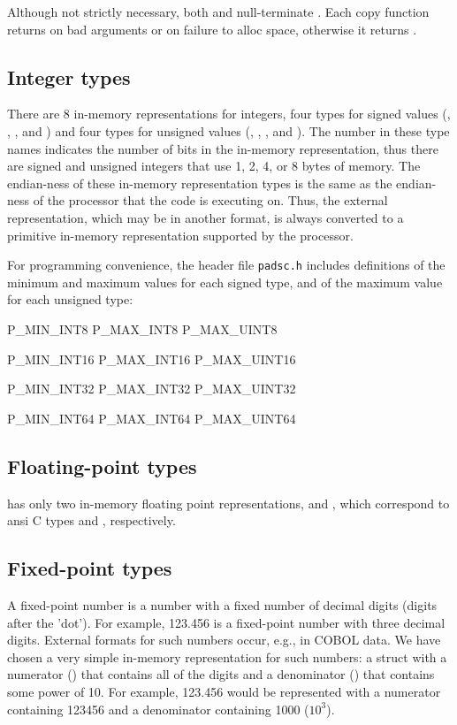 Although not strictly necessary, both  and  null-terminate .
Each copy function returns  on bad arguments or on failure to alloc space, otherwise it returns .

\subsection{Integer types}

There are 8 in-memory representations for integers, four types for
signed values (, , , and )
and four types for unsigned values (, , , and ).
The number in these type names indicates the number of bits in the in-memory representation,
thus there are signed and unsigned integers that use 1, 2, 4, or 8 bytes of memory.
The endian-ness of these in-memory representation types is the same as the
endian-ness of the processor that the code is executing on.  Thus,
the external representation, which may be in another format, is always converted
to a primitive in-memory representation supported by the processor.

For programming convenience, the header file {\tt padsc.h} includes definitions of the minimum
and maximum values for each signed type, and of the maximum value for each unsigned type:
\begin{tinycode}
P_MIN_INT8
P_MAX_INT8
P_MAX_UINT8

P_MIN_INT16
P_MAX_INT16
P_MAX_UINT16

P_MIN_INT32
P_MAX_INT32
P_MAX_UINT32

P_MIN_INT64
P_MAX_INT64
P_MAX_UINT64
\end{tinycode}

\subsection{Floating-point types}

\PADSL{} has only two in-memory floating point representations,
 and , which correspond to ansi C types 
and , respectively.

\subsection{Fixed-point types}

A fixed-point number is a number with a fixed number of decimal digits
(digits after the 'dot').  For example, 123.456 is a fixed-point
number with three decimal digits.  External formats for such numbers
occur, e.g., in COBOL data.  We have chosen a very simple in-memory
representation for such numbers: a struct with a numerator ()
that contains all of the digits and a denominator () that
contains some power of 10.  For example, 123.456 would be represented
with a numerator containing 123456 and a denominator containing 1000 ($10^3$).


